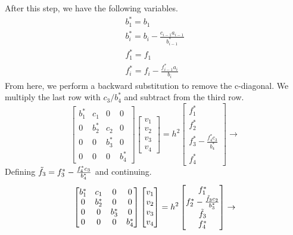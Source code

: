 \documentclass{article}
\begin{document}
After this step, we have the following variables.
\begin{equation}
    \begin{gathered}
    b_1^*= b_1  \\
    b_i^* = b_i - \frac{c_{i-1}a_{i-1}}{b_{i-1}^*}  \\
    f_1^* = f_1  \\
    f_i^* = f_i - \frac{f_{i-1}^*a_i}{b_i}
    \end{gathered}
\end{equation}
From here, we perform a backward substitution to remove the c-diagonal. We multiply the last row with $c_3/b_4^*$ and subtract from the third row.
\begin{equation}
    \begin{bmatrix}
        b_1^* & c_1 & 0 & 0 \\
        0 & b_2^* & c_2 & 0 \\
        0 & 0 & b_3^* & 0 \\
        0 & 0 & 0 & b_4^*
    \end{bmatrix}
    \begin{bmatrix}
        v_1 \\ v_2 \\ v_3 \\v_4
    \end{bmatrix}
    =h^2\begin{bmatrix}
        f_1^*\\
        f_2^*\\
        f_3^* - \frac{f_4^*c_3}{b_4^*}\\
        f_4^*
    \end{bmatrix}
    \rightarrow
\end{equation}
Defining $\Tilde{f}_3 = f_3^* - \frac{f_4^*c_3}{b_4^*}$ and continuing.
\begin{equation}
    \begin{bmatrix}
        b_1^* & c_1 & 0 & 0 \\
        0 & b_2^* & 0 & 0 \\
        0 & 0 & b_3^* & 0 \\
        0 & 0 & 0 & b_4^*
    \end{bmatrix}
    \begin{bmatrix}
        v_1 \\ v_2 \\ v_3 \\v_4
    \end{bmatrix}
    =h^2\begin{bmatrix}
        f_1^*\\
        f_2^* - \frac{\Tilde{f}_3c_2}{b_3^*}\\
        \Tilde{f}_3\\
        f_4^*
    \end{bmatrix}
    \rightarrow
\end{equation}
\end{document}

